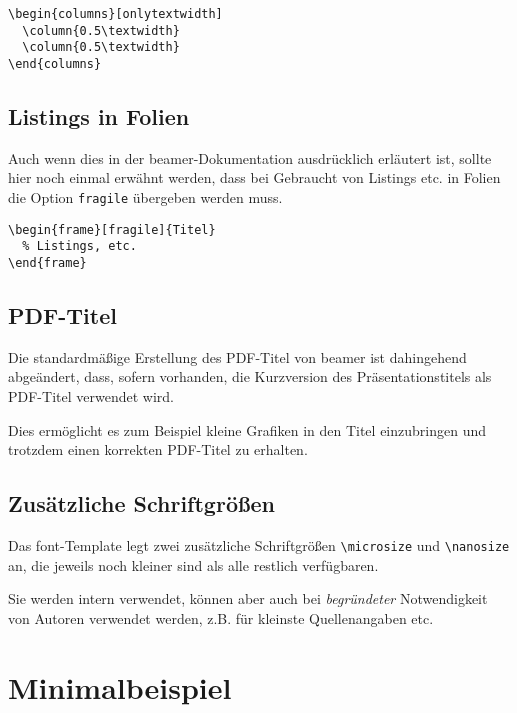 \begin{lstlisting}[morekeywords={onlytextwidth},keywordstyle=\color{tuOrange}]
\begin{columns}[onlytextwidth]
  \column{0.5\textwidth}
  \column{0.5\textwidth}
\end{columns}
\end{lstlisting}


\subsection{Listings in Folien}

Auch wenn dies in der beamer-Dokumentation ausdrücklich erläutert ist,
sollte hier noch einmal erwähnt werden, dass bei Gebraucht von Listings etc.
in Folien die Option \lstinline{fragile} übergeben werden muss.

\begin{lstlisting}
\begin{frame}[fragile]{Titel}
  % Listings, etc.
\end{frame}
\end{lstlisting}



\subsection{PDF-Titel}

Die standardmäßige Erstellung des PDF-Titel von beamer ist dahingehend
abgeändert, dass, sofern vorhanden, die Kurzversion des Präsentationstitels
als PDF-Titel verwendet wird.

Dies ermöglicht es zum Beispiel kleine Grafiken in den Titel einzubringen und
trotzdem einen korrekten PDF-Titel zu erhalten.


\subsection{Zusätzliche Schriftgrößen}

Das font-Template legt zwei zusätzliche Schriftgrößen \lstinline{\microsize}
und \lstinline{\nanosize} an, die jeweils noch kleiner sind als alle restlich
verfügbaren.

Sie werden intern verwendet, können aber auch bei \emph{begründeter}
Notwendigkeit von Autoren verwendet werden, z.B. für kleinste Quellenangaben
etc.


\section{Minimalbeispiel}%

